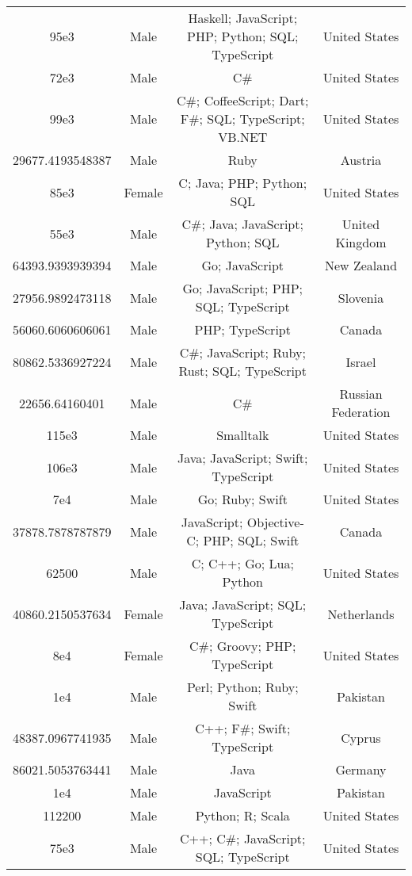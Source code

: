 \begin{center}
\begin{tabular}{ |c|c|c|c| }
95e3  &  Male  &  Haskell; JavaScript; PHP; Python; SQL; TypeScript  &  United States  \\ 
72e3  &  Male  &  C\#  &  United States  \\ 
99e3  &  Male  &  C\#; CoffeeScript; Dart; F\#; SQL; TypeScript; VB.NET  &  United States  \\ 
29677.4193548387  &  Male  &  Ruby  &  Austria  \\ 
85e3  &  Female  &  C; Java; PHP; Python; SQL  &  United States  \\ 
55e3  &  Male  &  C\#; Java; JavaScript; Python; SQL  &  United Kingdom  \\ 
64393.9393939394  &  Male  &  Go; JavaScript  &  New Zealand  \\ 
27956.9892473118  &  Male  &  Go; JavaScript; PHP; SQL; TypeScript  &  Slovenia  \\ 
56060.6060606061  &  Male  &  PHP; TypeScript  &  Canada  \\ 
80862.5336927224  &  Male  &  C\#; JavaScript; Ruby; Rust; SQL; TypeScript  &  Israel  \\ 
22656.64160401  &  Male  &  C\#  &  Russian Federation  \\ 
115e3  &  Male  &  Smalltalk  &  United States  \\ 
106e3  &  Male  &  Java; JavaScript; Swift; TypeScript  &  United States  \\ 
7e4  &  Male  &  Go; Ruby; Swift  &  United States  \\ 
37878.7878787879  &  Male  &  JavaScript; Objective-C; PHP; SQL; Swift  &  Canada  \\ 
62500  &  Male  &  C; C++; Go; Lua; Python  &  United States  \\ 
40860.2150537634  &  Female  &  Java; JavaScript; SQL; TypeScript  &  Netherlands  \\ 
8e4  &  Female  &  C\#; Groovy; PHP; TypeScript  &  United States  \\ 
1e4  &  Male  &  Perl; Python; Ruby; Swift  &  Pakistan  \\ 
48387.0967741935  &  Male  &  C++; F\#; Swift; TypeScript  &  Cyprus  \\ 
86021.5053763441  &  Male  &  Java  &  Germany  \\ 
1e4  &  Male  &  JavaScript  &  Pakistan  \\ 
112200  &  Male  &  Python; R; Scala  &  United States  \\ 
75e3  &  Male  &  C++; C\#; JavaScript; SQL; TypeScript  &  United States  \\ 

\end{tabular}
\end{center}

